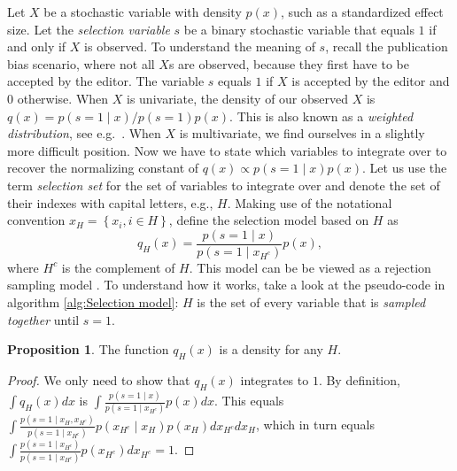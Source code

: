 \documentclass{article}
\theoremstyle{plain}
\theoremstyle{definition}
\newtheorem{prop}[theorem]{Proposition}
\begin{document}
Let $X$ be a stochastic variable with density $p(x)$, such as a standardized effect size. Let the \emph{selection variable} $s$ be a binary stochastic variable that equals $1$ if and only if $X$ is observed. To understand the meaning of $s$, recall the publication bias scenario, where not all $X$s are observed, because they first have to be accepted by the editor. The variable $s$ equals $1$ if $X$ is accepted by the editor and $0$ otherwise. When $X$ is univariate, the density of our observed $X$ is $q(x)=p\left(s=1\mid x\right)/p\left(s=1\right)p\left(x\right)$. This is also known as a \emph{weighted distribution}, see e.g.\ \citep[][eq. 3.1]{rao1985weighted}. When $X$ is multivariate, we find ourselves in a slightly more difficult position. Now we have to state which variables to integrate over to recover the normalizing constant of $q\left(x\right)\propto p\left(s=1\mid x\right)p\left(x\right)$. Let us use the term \emph{selection set} for the set of variables to integrate over and denote the set of their indexes with capital letters, e.g., $H$. Making use of the notational convention $x_{H}=\left\{ x_{i},i\in H\right\}$, define the selection model based on $H$ as
\begin{equation}
q_{H}(x)=\frac{p(s=1\mid x)}{p(s=1\mid x_{H^{c}})}p(x)\label{eq:H-selection model},
\end{equation}
where $H^c$ is the complement of $H$. This model can be be viewed as a rejection sampling model \citep{von1951various}. To understand how it works, take a look at the pseudo-code in algorithm \ref{alg:Selection model}: $H$ is the set of every variable that is \emph{sampled together} until $s=1$.

\begin{prop}
The function $q_{H}\left(x\right)$ is a density for any $H$.
\end{prop}

\begin{proof}
We only need to show that $q_{H}\left(x\right)$ integrates to $1$. By definition, $\int q_{H}\left(x\right)dx$ is $\int\frac{p\left(s=1\mid x\right)}{p\left(s=1\mid x_{H^{c}}\right)}p\left(x\right)dx.$ This equals $\int\frac{p\left(s=1\mid x_{H},x_{H^{c}}\right)}{p\left(s=1\mid x_{H^{c}}\right)}p\left(x_{H^{c}}\mid x_{H}\right)p\left(x_{H}\right)dx_{H^{c}}dx_{H}$,
which in turn equals $\int\frac{p\left(s=1\mid x_{H^{c}}\right)}{p\left(s=1\mid x_{H^{c}}\right)}p\left(x_{H^{c}}\right)dx_{H^{c}}=1$.
\end{proof}
\end{document}
